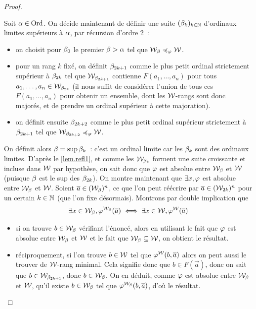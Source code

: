 \begin{proof}
\begin{itemize}
    Soit $\alpha \in \operatorname{Ord}$. On décide maintenant de définir une suite
    $(\beta_k)_{k \in \mathbb N}$ d'ordinaux limites supérieurs à $\alpha$, par
    récursion d'ordre 2~:
    \begin{itemize}
    \item on choisit pour $\beta_0$ le premier $\beta > \alpha$ tel que
      $\mathcal{W}_\beta \preccurlyeq_{\varphi} \mathcal{W}$.
    \item pour un rang $k$ fixé, on définit $\beta_{2k + 1}$ comme le plus
      petit ordinal strictement supérieur à $\beta_{2k}$ tel que
      $\mathcal{W}_{\beta_{2k + 1}}$ contienne $F(a_1,\ldots,a_n)$ pour tous
      $a_1,\ldots,a_n \in \mathcal{W}_{\beta_{2k}}$ (il nous suffit de considérer
      l'union de tous ces $F(a_1,\ldots,a_n)$ pour obtenir un ensemble, dont les
      $\mathcal{W}$-rangs sont donc majorés, et de prendre un ordinal supérieur
      à cette majoration).
    \item on définit ensuite $\beta_{2k + 2}$ comme le plus petit ordinal
      supérieur strictement à $\beta_{2k + 1}$ tel que
      $\mathcal{W}_{\beta_{2k + 2}}\preccurlyeq_{\varphi} \mathcal{W}$.
    \end{itemize}
    On définit alors $\beta = \sup \beta_k$~: c'est un ordinal limite car
    les $\beta_k$ sont des ordinaux limites. D'après le \cref{lem.refl1}, et
    comme les $\mathcal{W}_{\beta_k}$ forment une suite croissante et incluse dans
    $\mathcal{W}$ par hypothèse, on sait donc que $\varphi$ est absolue entre
    $\mathcal{W}_\beta$ et $\mathcal{W}$ (puisque $\beta$ est le sup des $\beta_{2k}$).
    On montre maintenant que $\exists x, \varphi$ est absolue entre
    $\mathcal{W}_\beta$ et $\mathcal{W}$. Soient $\overline{a} \in (\mathcal{W}_\beta)^n$, ce que
    l'on peut réécrire par $\overline{a} \in (\mathcal{W}_{2k})^n$ pour un certain
    $k \in \mathbb N$ (que l'on fixe désormais). Montrons par double implication que
    \[\exists x\in \mathcal{W}_\beta, \varphi^{\mathcal{W}_\beta}(\overline{a}) \iff
    \exists x \in \mathcal{W}, \varphi^{\mathcal{W}}(\overline{a})\]
    \begin{itemize}
    \item si on trouve $b \in \mathcal{W}_\beta$ vérifiant l'énoncé, alors en
      utilisant le fait que $\varphi$ est absolue entre $\mathcal{W}_\beta$ et
      $\mathcal{W}$ et le fait que $\mathcal{W}_\beta \subseteq \mathcal{W}$, on obtient le
      résultat.
    \item réciproquement, si l'on trouve $b \in \mathcal{W}$ tel que
      $\varphi^{\mathcal{W}}(b,\overline{a})$ alors on peut aussi le trouver de $\mathcal{W}$-rang
      minimal. Cela signifie donc que $b \in F(\vec a)$, donc on sait que
      $b \in \mathcal{W}_{\beta_{2k + 1}}$, donc $b \in \mathcal{W}_\beta$. On en déduit,
      comme $\varphi$ est absolue entre $\mathcal{W}_\beta$ et $\mathcal{W}$, qu'il existe
      $b\in \mathcal{W}_\beta$ tel que $\varphi^{\mathcal{W}_\beta}(b,\overline{a})$, d'où le
      résultat.\qedhere
    \end{itemize}
  \end{itemize}
\end{proof}

